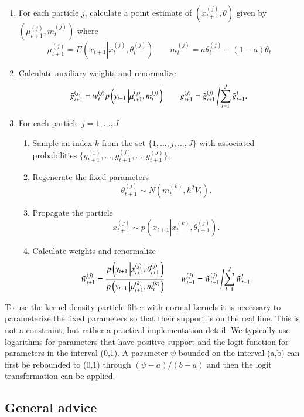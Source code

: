 \documentclass{elsarticle}
\begin{document}
\begin{enumerate}
\item For each particle $j$, calculate a point estimate of $\left(x_{t+1}^{(j)},\theta\right)$ given by $\left(\mu_{t+1}^{(j)},m_t^{(j)}\right)$ where
    \[
    \mu_{t+1}^{(j)} = E\left(x_{t+1}\left|x_t^{(j)},\theta_t^{(j)} \right.\right) \qquad
    m_t^{(j)} = a\theta_t^{(j)} + (1-a)\bar{\theta}_t
    \]
\item Calculate auxiliary weights and renormalize
\[ \tilde{g}_{t+1}^{(j)} = w_t^{(j)} p\left(y_{t+1}\left|\mu_{t+1}^{(j)},m_t^{(j)}\right.\right) \qquad g_{t+1}^{(j)} = \tilde{g}_{t+1}^{(j)}\left/ \sum_{l=1}^J \tilde{g}_{t+1}^l. \right. \]
\item For each particle $j=1,\ldots,J$
	\begin{enumerate}
    \item Sample an index $k$ from the set $\{1,\ldots,j,\ldots,J\}$ with associated probabilities $\{g_{t+1}^{(1)},\ldots,g_{t+1}^{(j)},\ldots,g_{t+1}^{(J)}\}$,
	\item Regenerate the fixed parameters
	\[ \theta_{t+1}^{(j)} \sim N\left( m_t^{(k)}, h^2V_t \right). \]
	\item Propagate the particle
	\[ x_{t+1}^{(j)} \sim p\left(x_{t+1}\left|x_t^{(k)},\theta_{t+1}^{(j)}\right.\right). \]
	\item Calculate weights and renormalize
	\[\tilde{w}_{t+1}^{(j)} = \frac{p\left(y_{t+1}\left|x_{t+1}^{(j)},\theta_{t+1}^{(j)}\right.\right)}{p\left(y_{t+1}\left|\mu_{t+1}^{(k)},m_t^{(k)}\right.\right)}
	\qquad
	w_{t+1}^{(j)} = \tilde{w}_{t+1}^{(j)}\left/\sum_{l=1}^J \tilde{w}_{t+1}^l \right.\]
	\end{enumerate}
\end{enumerate}

To use the kernel density particle filter with normal kernels it is necessary to parameterize the fixed parameters so that their support is on the real line. This is not a constraint, but rather a practical implementation detail. We typically use logarithms for parameters that have positive support and the logit function for parameters in the interval (0,1). A parameter $\psi$ bounded on the interval (a,b) can first be rebounded to (0,1) through $(\psi-a)/(b-a)$ and then the logit transformation can be applied.

\subsection{General advice}
\end{document}
